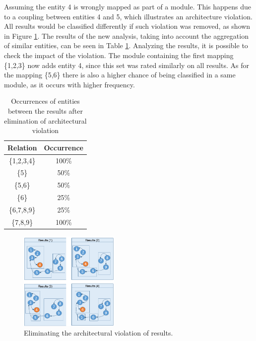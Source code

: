 \documentclass{sig-alternate-05-2015}
\begin{document}
 Assuming the entity 4 is wrongly mapped as part of a module. This happens due to a coupling between entities 4 and 5, which illustrates an architecture violation. All results would be classified differently if such violation was removed, as shown in Figure \ref{exemplo_comparacao_modelos2}. The results of the new analysis, taking into account the aggregation of similar entities, can be seen in Table \ref{ocorrencias_2}. Analyzing the results, it is possible to check the impact of the violation. The module containing the first mapping \{1,2,3\} now adds  entity 4, since this set was rated similarly on all results. As for the mapping \{5,6\} there is also a higher chance of being classified in a same module, as it occurs with higher frequency.


\begin{table}[]
	\centering
	\caption{Occurrences of entities between the results after elimination of architectural violation}
	\label{ocorrencias_2}
	\begin{tabular}{|cc|}
		\hline
		\multicolumn{1}{|l}{Relation} & \multicolumn{1}{l|}{Occurrence} \\ \hline
		\{1,2,3,4\}                   	  & 100\%                           \\
		\{5\}                			  & 50\%                            \\
		\{5,6\}                    		  & 50\%                            \\
		\{6\}                 			  & 25\%                            \\
		\{6,7,8,9\}                       & 25\%                            \\
		\{7,8,9\}                         & 100\%                            \\ \hline
	\end{tabular}
\end{table}

\begin{figure}[!h]
	\centering
	\includegraphics[width=0.43\textwidth]{exemplo_comparacao_modelos_2_en}
	\caption{Eliminating the architectural violation of results.}
	\label{exemplo_comparacao_modelos2}
\end{figure}
\end{document}
